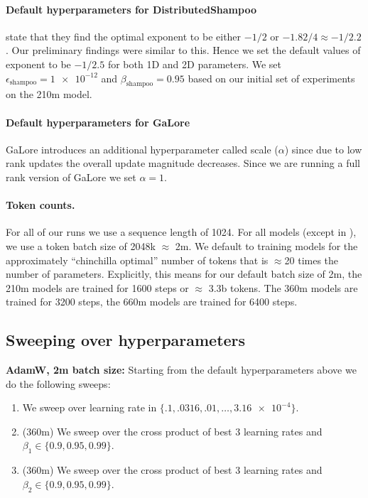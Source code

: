 \documentclass{article}
\def\eps{{\epsilon}}
\begin{document}
\paragraph{Default hyperparameters for DistributedShampoo} \citet{distributedshampoo} state that they find the optimal exponent to be either $-1/2$ or $-1.82/4 \approx -1/2.2$. Our preliminary findings were similar to this. Hence we set the default values of exponent to be $-1/2.5$ for both 1D and 2D parameters. We set $\eps_{\text{shampoo}} = \num{1e-12}$ and $\beta_{\text{shampoo}} = 0.95$ based on our initial set of experiments on the 210m model.

\paragraph{Default hyperparameters for GaLore} GaLore introduces an additional hyperparameter called scale ($\alpha$) since due to low rank updates the overall update magnitude decreases. Since we are running a full rank version of GaLore we set $\alpha = 1$.

\paragraph{Token counts.} For all of our runs we use a sequence length of 1024. For all models (except in ), we use a token batch size of 2048k $\approx$ 2m. We default to training models for the approximately ``chinchilla optimal'' number of tokens that is $ \approx$20 times the number of parameters. Explicitly, this means for our default batch size of 2m, the 210m models are trained for 1600 steps or $\approx$ 3.3b tokens. The 360m models are trained for 3200 steps, the 660m models are trained for 6400 steps.

\subsection{Sweeping over hyperparameters}

\textbf{AdamW, 2m batch size:} Starting from the default hyperparameters above we do the following sweeps:
\begin{enumerate}
    \item We sweep over learning rate in $\{.1, .0316, .01,\ldots, \num{3.16e-4}\}$.
    \item (360m) We sweep over the cross product of best 3 learning rates and $\beta_1 \in \{0.9, 0.95, 0.99\}$.
    \item (360m) We sweep over the cross product of best 3 learning rates and $\beta_2 \in \{0.9, 0.95, 0.99\}$.
\end{enumerate}
\end{document}
